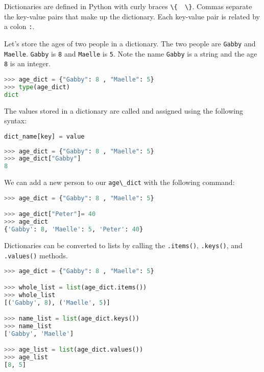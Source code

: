 \documentclass{book}
\newcommand{\passthrough}[1]{#1}
\begin{document}
Dictionaries are defined in Python with curly braces
\passthrough{\lstinline!\{  \}!}. Commas separate the key-value pairs
that make up the dictionary. Each key-value pair is related by a colon
\passthrough{\lstinline!:!}.

Let's store the ages of two people in a dictionary. The two people are
\passthrough{\lstinline!Gabby!} and \passthrough{\lstinline!Maelle!}.
\passthrough{\lstinline!Gabby!} is \passthrough{\lstinline!8!} and
\passthrough{\lstinline!Maelle!} is \passthrough{\lstinline!5!}. Note
the name \passthrough{\lstinline!Gabby!} is a string and the age
\passthrough{\lstinline!8!} is an integer.

\begin{lstlisting}[language=Python]
>>> age_dict = {"Gabby": 8 , "Maelle": 5}
>>> type(age_dict)
dict
\end{lstlisting}

The values stored in a dictionary are called and assigned using the
following syntax:

\begin{lstlisting}[language=Python]
dict_name[key] = value
\end{lstlisting}

\begin{lstlisting}[language=Python]
>>> age_dict = {"Gabby": 8 , "Maelle": 5}
>>> age_dict["Gabby"]
8
\end{lstlisting}

We can add a new person to our \passthrough{\lstinline!age\_dict!} with
the following command:

\begin{lstlisting}[language=Python]
>>> age_dict = {"Gabby": 8 , "Maelle": 5}

>>> age_dict["Peter"]= 40
>>> age_dict
{'Gabby': 8, 'Maelle': 5, 'Peter': 40}
\end{lstlisting}

Dictionaries can be converted to lists by calling the
\passthrough{\lstinline!.items()!}, \passthrough{\lstinline!.keys()!},
and \passthrough{\lstinline!.values()!} methods.

\begin{lstlisting}[language=Python]
>>> age_dict = {"Gabby": 8 , "Maelle": 5}

>>> whole_list = list(age_dict.items())
>>> whole_list
[('Gabby', 8), ('Maelle', 5)]

>>> name_list = list(age_dict.keys())
>>> name_list
['Gabby', 'Maelle']

>>> age_list = list(age_dict.values())
>>> age_list
[8, 5]
\end{lstlisting}
\end{document}
